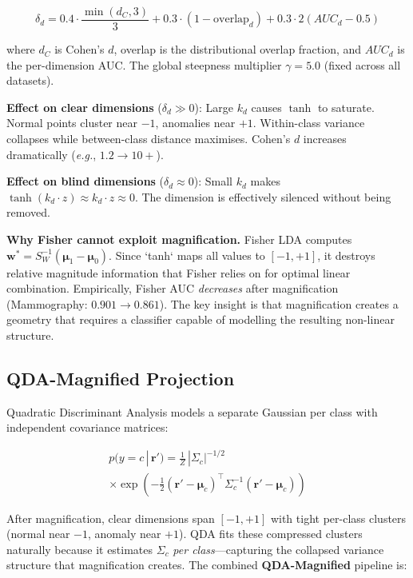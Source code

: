 \documentclass[journal]{IEEEtran}
\newcommand{\eg}{\textit{e.g.}}
\begin{document}
\begin{equation}
\delta_d = 0.4 \cdot \frac{\min(d_C, 3)}{3} + 0.3 \cdot (1 - \text{overlap}_d) + 0.3 \cdot 2(AUC_d - 0.5)
\label{eq:disc_score}
\end{equation}

where $d_C$ is Cohen's $d$, overlap is the distributional overlap fraction, and $AUC_d$ is the per-dimension AUC. The global steepness multiplier $\gamma = 5.0$ (fixed across all datasets).

\textbf{Effect on clear dimensions} ($\delta_d \gg 0$): Large $k_d$ causes $\tanh$ to saturate. Normal points cluster near $-1$, anomalies near $+1$. Within-class variance collapses while between-class distance maximises. Cohen's $d$ increases dramatically (\eg, $1.2 \to 10+$).

\textbf{Effect on blind dimensions} ($\delta_d \approx 0$): Small $k_d$ makes $\tanh(k_d \cdot z) \approx k_d \cdot z \approx 0$. The dimension is effectively silenced without being removed.

\textbf{Why Fisher cannot exploit magnification.} Fisher LDA computes $\mathbf{w}^* = S_W^{-1}(\boldsymbol{\mu}_1 - \boldsymbol{\mu}_0)$. Since `tanh` maps all values to $[-1, +1]$, it destroys relative magnitude information that Fisher relies on for optimal linear combination. Empirically, Fisher AUC \textit{decreases} after magnification (Mammography: $0.901 \to 0.861$). The key insight is that magnification creates a geometry that requires a classifier capable of modelling the resulting non-linear structure.

\subsection{QDA-Magnified Projection}
\label{ssec:qda}

Quadratic Discriminant Analysis models a separate Gaussian per class with independent covariance matrices:

\begin{multline}
p(y{=}c \,|\, \mathbf{r}') = \frac{1}{Z}\, |\Sigma_c|^{-1/2} \\
  \times \exp\!\left(-\tfrac{1}{2}(\mathbf{r}' - \boldsymbol{\mu}_c)^\top \Sigma_c^{-1} (\mathbf{r}' - \boldsymbol{\mu}_c)\right)
\label{eq:qda}
\end{multline}

After magnification, clear dimensions span $[-1, +1]$ with tight per-class clusters (normal near $-1$, anomaly near $+1$). QDA fits these compressed clusters naturally because it estimates $\Sigma_c$ \textit{per class}---capturing the collapsed variance structure that magnification creates. The combined \textbf{QDA-Magnified} pipeline is:
\end{document}

